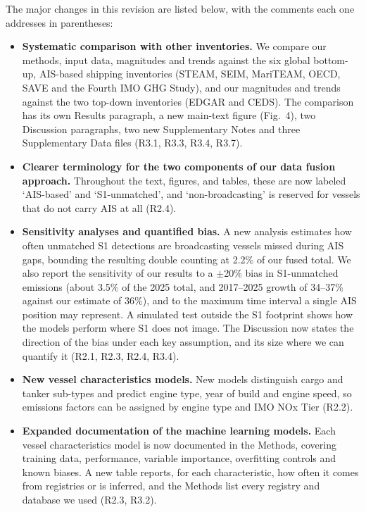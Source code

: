 \documentclass[11pt]{article}
\begin{document}
The major changes in this revision are listed below, with the comments each one addresses in parentheses:

\begin{itemize}[leftmargin=*, itemsep=2pt]
  \item \textbf{Systematic comparison with other inventories.} We compare our methods, input data, magnitudes and trends against the six global bottom-up, AIS-based shipping inventories (STEAM, SEIM, MariTEAM, OECD, SAVE and the Fourth IMO GHG Study), and our magnitudes and trends against the two top-down inventories (EDGAR and CEDS). The comparison has its own Results paragraph, a new main-text figure (Fig.~4), two Discussion paragraphs, two new Supplementary Notes and three Supplementary Data files (R3.1, R3.3, R3.4, R3.7).
  \item \textbf{Clearer terminology for the two components of our data fusion approach.} Throughout the text, figures, and tables, these are now labeled `AIS-based' and `S1-unmatched', and `non-broadcasting' is reserved for vessels that do not carry AIS at all (R2.4).
  \item \textbf{Sensitivity analyses and quantified bias.} A new analysis estimates how often unmatched S1 detections are broadcasting vessels missed during AIS gaps, bounding the resulting double counting at 2.2\% of our fused total. We also report the sensitivity of our results to a $\pm$20\% bias in S1-unmatched emissions (about 3.5\% of the 2025 total, and 2017--2025 growth of 34--37\% against our estimate of 36\%), and to the maximum time interval a single AIS position may represent. A simulated test outside the S1 footprint shows how the models perform where S1 does not image. The Discussion now states the direction of the bias under each key assumption, and its size where we can quantify it (R2.1, R2.3, R2.4, R3.4).
  \item \textbf{New vessel characteristics models.} New models distinguish cargo and tanker sub-types and predict engine type, year of build and engine speed, so emissions factors can be assigned by engine type and IMO NOx Tier (R2.2).
  \item \textbf{Expanded documentation of the machine learning models.} Each vessel characteristics model is now documented in the Methods, covering training data, performance, variable importance, overfitting controls and known biases. A new table reports, for each characteristic, how often it comes from registries or is inferred, and the Methods list every registry and database we used (R2.3, R3.2).

\end{itemize}
\end{document}
